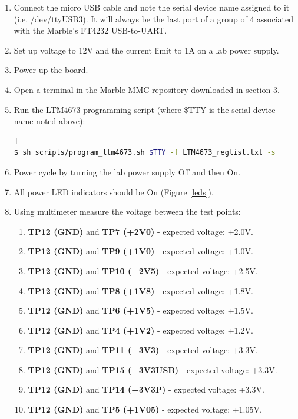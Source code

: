 \documentclass[12pt,oneside,a4]{article}
\begin{document}
\begin{enumerate}
    \item Connect the micro USB cable and note the serial device name assigned to it (i.e. /dev/ttyUSB3).  It will always be the last port of a group of 4 associated with the Marble's FT4232 USB-to-UART.
    \item Set up voltage to 12V and the current limit to 1A on a lab power supply.
    \item Power up the board.
    \item Open a terminal in the Marble-MMC repository downloaded in section 3.
    \item Run the LTM4673 programming script (where \$TTY is the serial device name noted above):
      \begin{lstlisting}[backgroundcolor = \color{Gainsboro}, language=bash, frame=none]]
$ sh scripts/program_ltm4673.sh $TTY -f LTM4673_reglist.txt -s
      \end{lstlisting}
    \item Power cycle by turning the lab power supply Off and then On.
    \item All power LED indicators should be On (Figure \ref{leds}).
    \item Using multimeter measure the voltage between the test points:
    \begin{enumerate}
	\item \textbf{TP12 (GND)} and \textbf{TP7 (+2V0)} - expected voltage: +2.0V.
	\item \textbf{TP12 (GND)} and \textbf{TP9 (+1V0)} - expected voltage: +1.0V.
	\item \textbf{TP12 (GND)} and \textbf{TP10 (+2V5)} - expected voltage: +2.5V.
	\item \textbf{TP12 (GND)} and \textbf{TP8 (+1V8)} - expected voltage: +1.8V.
	\item \textbf{TP12 (GND)} and \textbf{TP6 (+1V5)} - expected voltage: +1.5V.
	\item \textbf{TP12 (GND)} and \textbf{TP4 (+1V2)} - expected voltage: +1.2V.
	\item \textbf{TP12 (GND)} and \textbf{TP11 (+3V3)} - expected voltage: +3.3V.
	\item \textbf{TP12 (GND)} and \textbf{TP15 (+3V3USB)} - expected voltage: +3.3V.
	\item \textbf{TP12 (GND)} and \textbf{TP14 (+3V3P)} - expected voltage: +3.3V.
	\item \textbf{TP12 (GND)} and \textbf{TP5 (+1V05)} - expected voltage: +1.05V.
\end{enumerate}
\end{enumerate}
\end{document}
